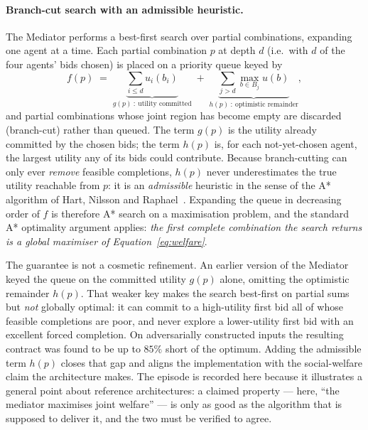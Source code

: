 \paragraph{Branch-cut search with an admissible heuristic.}
The Mediator performs a best-first search over partial combinations,
expanding one agent at a time. Each partial combination $p$ at depth
$d$ (i.e.\ with $d$ of the four agents' bids chosen) is placed on a
priority queue keyed by
%
\begin{equation}
  \label{eq:astar}
  f(p) \;=\; \underbrace{\sum_{i \le d} u_i(b_i)}_{g(p)\ :\ \text{utility committed}}
           \;+\; \underbrace{\sum_{j > d} \max_{b \in B_j} u(b)}_{h(p)\ :\ \text{optimistic remainder}} ,
\end{equation}
%
and partial combinations whose joint region has become empty are
discarded (branch-cut) rather than queued. The term $g(p)$ is the
utility already committed by the chosen bids; the term $h(p)$ is, for
each not-yet-chosen agent, the largest utility any of its bids could
contribute. Because branch-cutting can only ever \emph{remove}
feasible completions, $h(p)$ never underestimates the true utility
reachable from $p$: it is an \emph{admissible} heuristic in the sense of
the A* algorithm of Hart, Nilsson and Raphael~\cite{hart1968astar}.
Expanding the queue in
decreasing order of $f$ is therefore A* search on a maximisation
problem, and the standard A* optimality argument applies: \emph{the
first complete combination the search returns is a global maximiser of
Equation~\eqref{eq:welfare}}.

The guarantee is not a cosmetic refinement. An earlier version of the
Mediator keyed the queue on the committed utility $g(p)$ alone, omitting
the optimistic remainder $h(p)$. That weaker key makes the search
best-first on partial sums but \emph{not} globally optimal: it can
commit to a high-utility first bid all of whose feasible completions are
poor, and never explore a lower-utility first bid with an excellent
forced completion. On adversarially constructed inputs the resulting
contract was found to be up to $85\%$ short of the optimum. Adding the
admissible term $h(p)$ closes that gap and aligns the implementation
with the social-welfare claim the architecture makes. The episode is
recorded here because it illustrates a general point about reference
architectures: a claimed property --- here, ``the mediator maximises
joint welfare'' --- is only as good as the algorithm that is supposed
to deliver it, and the two must be verified to agree.

